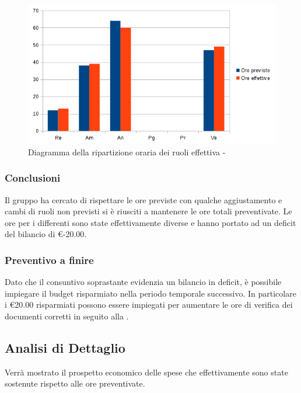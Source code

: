 \documentclass[12pt,a4paper]{article}
\begin{document}
\begin{center}
	\begin{figure}[H]
		\centering
		\includegraphics[width=\textwidth]{../img/diagrammaBarreAnalisiConsuntivo.png}
		\caption{Diagramma della ripartizione oraria dei ruoli effettiva - \FA{}}
	\end{figure}
\end{center}

\subsubsection{Conclusioni}
Il gruppo ha cercato di rispettare le ore previste con qualche aggiustamento e cambi di ruoli non previsti si è riusciti a mantenere le ore totali preventivate. Le ore per i differenti  sono state effettivamente diverse e hanno portato ad un deficit del bilancio di \euro{}-20.00.

\subsubsection{Preventivo a finire}
\label{sec:paf-analisi}
Dato che il consuntivo soprastante evidenzia un bilancio in deficit, è possibile impiegare il budget risparmiato
nella periodo temporale successivo. In particolare i \euro{}20.00 risparmiati possono essere impiegati per aumentare
le ore di verifica dei documenti corretti in seguito alla \RR{}.

\newpage

\subsection{Analisi di Dettaglio}
Verrà mostrato il prospetto economico delle spese che effettivamente sono state sostenute rispetto alle ore preventivate.
\end{document}
